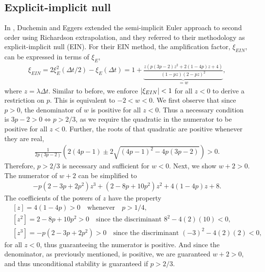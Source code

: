 \subsection{Explicit-implicit null}
In \cite{duchemin2014explicit}, Duchemin and Eggers extended the semi-implicit Euler approach to second order using Richardson extrapolation, and they referred to their methodology as explicit-implicit null (EIN). For their EIN method, the amplification factor, $\xi_{EIN}$, can be expressed in terms of $\xi_E$, 
\begin{align}
\xi_{EIN} 
= 2\xi^2_{E}(\Delta t/2) - \xi_E(\Delta t) 
= 1 + \underbrace{\frac{z\left(p(3p-2)z^2 + 2(1-4p)z + 4 \right)}{(1 - pz)(2-pz)^2}}_{=w},
\end{align} 
where $z = \lambda\Delta t$. Similar to before, we enforce $\left|\xi_{EIN}\right|<1$ for all $z<0$ to derive a restriction on $p$. This is equivalent to $-2 < w < 0$. We first observe that since $p>0$, the denominator of $w$ is positive for all $z<0$. Thus a necessary condition is $3p-2 > 0 \iff p>2/3$, as we require the quadratic in the numerator to be positive for all $z<0$. Further, the roots of that quadratic are positive whenever they are real,
\begin{align}
\frac{1}{2p(3p-2)}\left(2(4p-1) \pm  2\sqrt{(4p-1)^2 - 4p(3p-2)}\right) > 0.
\end{align} 
Therefore, $p>2/3$ is necessary and sufficient for $w<0$. Next, we show $w+2>0$. The numerator of $w+2$ can be simplified to 
\begin{align}
-p(2-3p+2p^2) z^3 + (2-8p+10p^2)z^2 + 4(1-4p)z + 8.
\end{align}
The coefficients of the powers of $z$ have the property
\begin{align*}
& [z] = 4(1-4p) > 0 \quad\text{whenever}\quad p > 1/4,
\\
&[z^2] = 2-8p + 10p^2 > 0 \quad\text{since the discriminant } 8^2 - 4(2)(10) < 0,
\\
&[z^3] = -p(2-3p+2p^2) > 0 \quad\text{since the discriminant } (-3)^2 - 4(2)(2) < 0,
\end{align*}
for all $z<0$, thus guaranteeing the numerator is positive. And since the denominator, as previously mentioned, is positive, we are guaranteed $w+2>0$, and thus unconditional stability is guaranteed if $p>2/3$.

